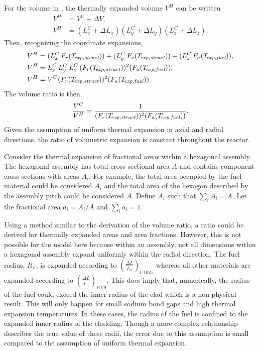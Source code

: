     For the volume in , the thermally expanded 
    volume $V^H$ can be written
    \begin{align}
      V^H &= V^C + \Delta V, \\
      V^H &= (L_x^C + \Delta L_x) (L_y^C + \Delta L_y) (L_z^C + \Delta L_z). 
    \end{align}
    Then, recognizing the coordinate expansions,
    \begin{align}
      V^H &= (L_x^C \, F_r(T_{\!\mbox{\scriptsize \em exp,struct}})) + 
        (L_y^C \, F_r(T_{\!\mbox{\scriptsize \em exp,struct}})) + 
        (L_z^C \, F_a({T_{\!\mbox{\scriptsize \em exp,fuel}}})), \\
      V^H &= L_x^C \, L_y^C \, L_z^C \, (F_r(T_{\!\mbox{\scriptsize \em exp,struct}}))^2
        (F_a({T_{\!\mbox{\scriptsize \em exp,fuel}}})), \\
      V^H &= V^C (F_r(T_{\!\mbox{\scriptsize \em exp,struct}}))^2 (F_a({T_{\!\mbox{\scriptsize \em exp,fuel}}})).
    \end{align}
    The volume ratio is then
    \begin{equation}
      \label{eq:volume_ratio}
      \frac{V^C}{V^H} = \frac{1}{(F_r(T_{\!\mbox{\scriptsize \em exp,struct}}))^2 (F_a({T_{\!\mbox{\scriptsize \em exp,fuel}}}))}.
    \end{equation}
    Given the assumption of uniform thermal expansion in axial and radial
    directions, the ratio of volumetric expansion is constant throughout the
    reactor.

    Consider the thermal expansion of fractional areas within a hexagonal
    assembly. The hexagonal assembly has total cross-sectional area $A$ and
    contains component cross sections with areas $A_i$. For example, the total
    area occupied by the fuel material could be considered $A_i$ and the total
    area of the hexagon described by the assembly pitch could be considered $A$.
    Define $A_i$ such that $\sum_{i} A_i = A$. Let the fractional area $a_i =
    A_i/A$ and $\sum_{i} a_i = 1$.

    Using a method similar to the derivation of the volume ratio, a ratio could
    be derived for thermally expanded areas and area fractions. However, this is
    not possible for the model here because within an assembly, not all
    dimensions within a hexagonal assembly expand uniformly within the radial
    direction. The fuel radius, $R_F$, is expanded according to
    $\left(\frac{\Delta L}{L_0}\right)_{\text{U10Zr}}$ whereas all other
    materials are expanded according to $\left(\frac{\Delta
    L}{L_0}\right)_{\text{HT9}}$. This does imply that, numerically, the radius
    of the fuel could exceed the inner radius of the clad which is a
    non-physical result. This will only happen for small sodium bond gaps and
    high thermal expansion temperatures. In these cases, the radius of the fuel
    is confined to the expanded inner radius of the cladding. Though a more
    complex relationship describes the true value of these radii, the error due
    to this assumption is small compared to the assumption of uniform thermal
    expansion.
    
